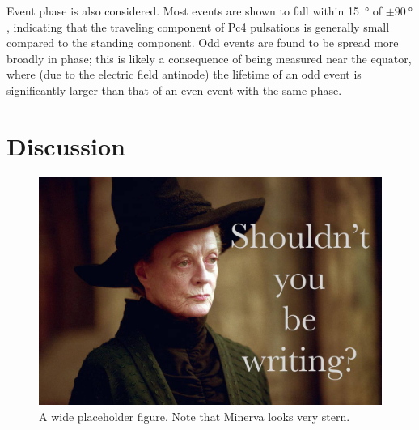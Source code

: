 \documentclass[jgrga]{agutex}
\begin{document}
\begin{article}
Event phase is also considered. Most events are shown to fall within
\SI{15}{\degree} of $\pm\SI{90}{\degree}$, indicating that the traveling
component of Pc4 pulsations is generally small compared to the standing
component. Odd events are found to be spread more broadly in phase; this
is likely a consequence of being measured near the equator, where (due
to the electric field antinode) the lifetime of an odd event is
significantly larger than that of an even event with the same phase. 


\section{Discussion}






\end{article}


\begin{figure}
    \label{fig_placeholder_wide}
    \begin{center}
    \includegraphics[width=\textwidth]{figures/placeholder.jpg}
    \caption{
        A wide placeholder figure. Note that Minerva looks very stern.
    }
    \end{center}
\end{figure}
\end{document}

